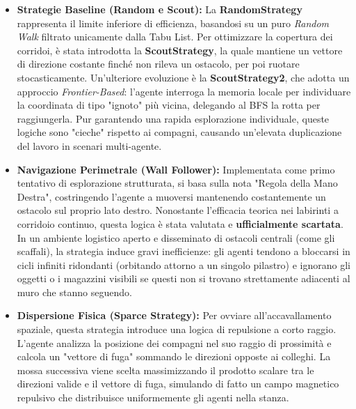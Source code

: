 \documentclass[11pt,a4paper]{article}
\begin{document}
\begin{itemize}
    \item \textbf{Strategie Baseline (Random e Scout):} La \textbf{RandomStrategy} rappresenta il limite inferiore di efficienza, basandosi su un puro \textit{Random Walk} filtrato unicamente dalla Tabu List. Per ottimizzare la copertura dei corridoi, è stata introdotta la \textbf{ScoutStrategy}, la quale mantiene un vettore di direzione costante finché non rileva un ostacolo, per poi ruotare stocasticamente. Un'ulteriore evoluzione è la \textbf{ScoutStrategy2}, che adotta un approccio \textit{Frontier-Based}: l'agente interroga la memoria locale per individuare la coordinata di tipo "ignoto" più vicina, delegando al BFS la rotta per raggiungerla. Pur garantendo una rapida esplorazione individuale, queste logiche sono "cieche" rispetto ai compagni, causando un'elevata duplicazione del lavoro in scenari multi-agente.

    \item \textbf{Navigazione Perimetrale (Wall Follower):} Implementata come primo tentativo di esplorazione strutturata, si basa sulla nota "Regola della Mano Destra", costringendo l'agente a muoversi mantenendo costantemente un ostacolo sul proprio lato destro. Nonostante l'efficacia teorica nei labirinti a corridoio continuo, questa logica è stata valutata e \textbf{ufficialmente scartata}. In un ambiente logistico aperto e disseminato di ostacoli centrali (come gli scaffali), la strategia induce gravi inefficienze: gli agenti tendono a bloccarsi in cicli infiniti ridondanti (orbitando attorno a un singolo pilastro) e ignorano gli oggetti o i magazzini visibili se questi non si trovano strettamente adiacenti al muro che stanno seguendo.
    
    \item \textbf{Dispersione Fisica (Sparce Strategy):} Per ovviare all'accavallamento spaziale, questa strategia introduce una logica di repulsione a corto raggio. L'agente analizza la posizione dei compagni nel suo raggio di prossimità e calcola un "vettore di fuga" sommando le direzioni opposte ai colleghi. La mossa successiva viene scelta massimizzando il prodotto scalare tra le direzioni valide e il vettore di fuga, simulando di fatto un campo magnetico repulsivo che distribuisce uniformemente gli agenti nella stanza.
    

\end{itemize}
\end{document}
